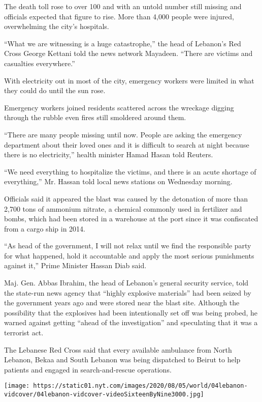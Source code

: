 The death toll rose to over 100 and with an untold number still missing
and officials expected that figure to rise. More than 4,000 people were
injured, overwhelming the city's hospitals.

``What we are witnessing is a huge catastrophe,'' the head of Lebanon's
Red Cross George Kettani told the news network Mayadeen. ``There are
victims and casualties everywhere.''

With electricity out in most of the city, emergency workers were limited
in what they could do until the sun rose.

Emergency workers joined residents scattered across the wreckage digging
through the rubble even fires still smoldered around them.

``There are many people missing until now. People are asking the
emergency department about their loved ones and it is difficult to
search at night because there is no electricity,'' health minister Hamad
Hasan told Reuters.

``We need everything to hospitalize the victims, and there is an acute
shortage of everything,'' Mr. Hassan told local news stations on
Wednesday morning.

Officials said it appeared the blast was caused by the detonation of
more than 2,700 tons of ammonium nitrate, a chemical commonly used in
fertilizer and bombs, which had been stored in a warehouse at the port
since it was confiscated from a cargo ship in 2014.

``As head of the government, I will not relax until we find the
responsible party for what happened, hold it accountable and apply the
most serious punishments against it,'' Prime Minister Hassan Diab said.

Maj. Gen. Abbas Ibrahim, the head of Lebanon's general security service,
told the state-run news agency that ``highly explosive materials'' had
been seized by the government years ago and were stored near the blast
site. Although the possibility that the explosives had been
intentionally set off was being probed, he warned against getting
``ahead of the investigation'' and speculating that it was a terrorist
act.

The Lebanese Red Cross said that every available ambulance from North
Lebanon, Bekaa and South Lebanon was being dispatched to Beirut to help
patients and engaged in search-and-rescue operations.

\texttt{[image: https://static01.nyt.com/images/2020/08/05/world/04lebanon-vidcover/04lebanon-vidcover-videoSixteenByNine3000.jpg]}

